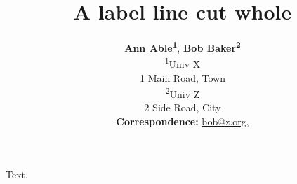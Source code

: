 \documentclass{article}
\begin{document}
\title{A label line cut whole}
\author{\textbf{Ann Able\textsuperscript{1}}, \textbf{Bob Baker\textsuperscript{2}}\\
\textsuperscript{1}Univ X\\
1 Main Road, Town\\
\textsuperscript{2}Univ Z\\
2 Side Road, City\\
\small{\textbf{Correspondence:} \href{mailto:bob@z.org}{bob@z.org},}}
\date{}
\maketitle
Text.
\end{document}
